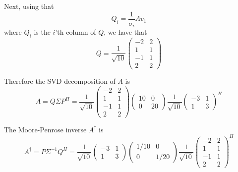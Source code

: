 \documentclass[a4paper,11pt]{article}
\begin{document}
Next, using that 
\[
    Q_i = \frac{1}{\sigma_i} Av_1
\]
where $Q_i$ is the $i$'th column of $Q$, we have that
\[
    Q = \frac{1}{\sqrt{10}}
    \begin{pmatrix}
        -2 & 2 \\   
         1 & 1 \\
        -1 & 1 \\
         2 & 2
    \end{pmatrix}
\]

Therefore the SVD decomposition of $A$ is 
\[
    A = Q\Sigma P^H = 
    \frac{1}{\sqrt{10}}
    \begin{pmatrix}
        -2 & 2 \\   
         1 & 1 \\
        -1 & 1 \\
         2 & 2
    \end{pmatrix}
    \begin{pmatrix}
        10 & 0 \\
        0  & 20
    \end{pmatrix}
    \frac{1}{\sqrt{10}}
    \begin{pmatrix}
        -3 & 1 \\    
        1  & 3
    \end{pmatrix}^H
\]

The Moore-Penrose inverse $A^\dagger$ is 
\[
    A^\dagger = P\Sigma^{-1} Q^H = 
    \frac{1}{\sqrt{10}} 
    \begin{pmatrix}
        -3 & 1 \\    
        1  & 3
    \end{pmatrix}
    \begin{pmatrix}
        1/10 & 0 \\
        0    & 1/20
    \end{pmatrix}
    \frac{1}{\sqrt{10}}
    \begin{pmatrix}
        -2 & 2 \\   
         1 & 1 \\
        -1 & 1 \\
         2 & 2
    \end{pmatrix}^H
\]
\end{document}
